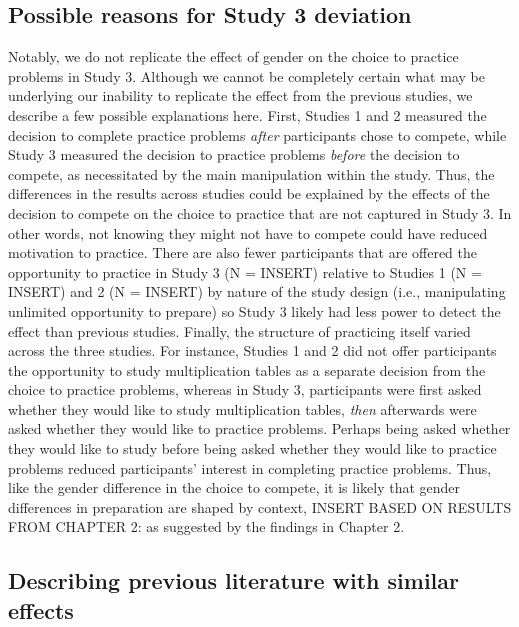 \documentclass[a4paper,nobind]{templates/ociamthesis}
\begin{document}
\hypertarget{possible-reasons-for-study-3-deviation}{%
\subsection{Possible reasons for Study 3 deviation}\label{possible-reasons-for-study-3-deviation}}

Notably, we do not replicate the effect of gender on the choice to practice problems in Study 3. Although we cannot be completely certain what may be underlying our inability to replicate the effect from the previous studies, we describe a few possible explanations here. First, Studies 1 and 2 measured the decision to complete practice problems \emph{after} participants chose to compete, while Study 3 measured the decision to practice problems \emph{before} the decision to compete, as necessitated by the main manipulation within the study. Thus, the differences in the results across studies could be explained by the effects of the decision to compete on the choice to practice that are not captured in Study 3. In other words, not knowing they might not have to compete could have reduced motivation to practice. There are also fewer participants that are offered the opportunity to practice in Study 3 (N = INSERT) relative to Studies 1 (N = INSERT) and 2 (N = INSERT) by nature of the study design (i.e., manipulating unlimited opportunity to prepare) so Study 3 likely had less power to detect the effect than previous studies. Finally, the structure of practicing itself varied across the three studies. For instance, Studies 1 and 2 did not offer participants the opportunity to study multiplication tables as a separate decision from the choice to practice problems, whereas in Study 3, participants were first asked whether they would like to study multiplication tables, \emph{then} afterwards were asked whether they would like to practice problems. Perhaps being asked whether they would like to study before being asked whether they would like to practice problems reduced participants' interest in completing practice problems. Thus, like the gender difference in the choice to compete, it is likely that gender differences in preparation are shaped by context, INSERT BASED ON RESULTS FROM CHAPTER 2: as suggested by the findings in Chapter 2.

\hypertarget{describing-previous-literature-with-similar-effects}{%
\subsection{Describing previous literature with similar effects}\label{describing-previous-literature-with-similar-effects}}
\end{document}
